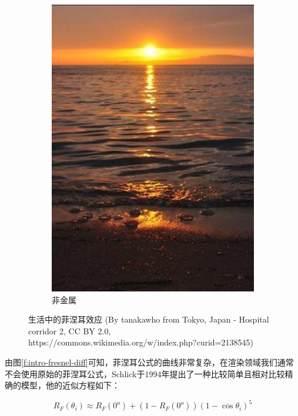 \begin{figure}
\begin{subfigure}[b]{0.5\textwidth}
		\includegraphics[width=1.\textwidth]{figures/intro/fresnel-4}
		\caption{非金属}
	\end{subfigure}
	\caption{生活中的菲涅耳效应 (By tanakawho from Tokyo, Japan - Hospital corridor 2, CC BY 2.0, https://commons.wikimedia.org/w/index.php?curid=2138545)}
\label{f:intro-fresnel-diff-1}
\end{figure}

由图\ref{f:intro-fresnel-diff}可知，菲涅耳公式的曲线非常复杂，在渲染领域我们通常不会使用原始的菲涅耳公式，Schlick\cite{a:AnInexpensiveBRDFModelforPhysically-BasedRendering}于1994年提出了一种比较简单且相对比较精确的模型，他的近似方程如下：

\begin{equation}
	R_F(\theta_i)\approx R_F(0^o)+(1-R_F(0^o))(1-\overline{\cos}\theta_i)^5
\end{equation}

